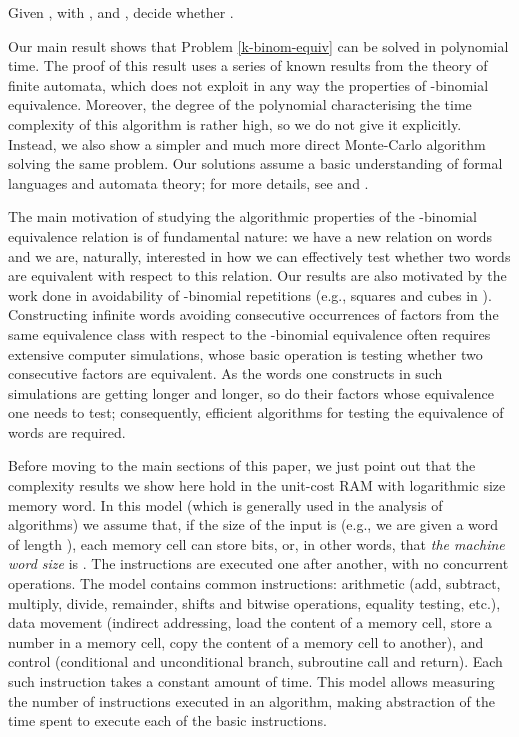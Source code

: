 \documentclass[runningheads]{llncs}
\begin{document}
\begin{problem}\label{k-binom-equiv}
Given , with , and , decide whether .
\end{problem}

Our main result shows that Problem \ref{k-binom-equiv} can be solved in polynomial time. The proof of this result uses a series of known results from the theory of finite automata, which does not exploit in any way the properties of -binomial equivalence. Moreover, the degree of the polynomial characterising the time complexity of this algorithm is rather high, so we do not give it explicitly. Instead, we also show a simpler and much more direct Monte-Carlo algorithm solving the same problem. Our solutions assume a basic understanding of formal languages and automata theory; for more details, see \cite{roz:han} and \cite{Sak09}.

The main motivation of studying the algorithmic properties of the -binomial equivalence relation is of fundamental nature: we have a new relation on words and we are, naturally, interested in how we can effectively test whether two words are equivalent with respect to this relation. Our results are also motivated by the work done in avoidability of -binomial repetitions (e.g., squares and cubes in \cite{rigo2}). Constructing infinite words avoiding consecutive occurrences of factors from the same equivalence class with respect to the -binomial equivalence often requires extensive computer simulations, whose basic operation is testing whether two consecutive factors are equivalent. As the words one constructs in such simulations are getting longer and longer, so do their factors whose equivalence one needs to test; consequently, efficient algorithms for testing the equivalence of words are required.

Before moving to the main sections of this paper, we just point out that the complexity results we show here hold in the unit-cost RAM with logarithmic size memory word. In this model (which is generally used in the analysis of algorithms) we assume that, if the size of the input is  (e.g., we are given a word of length ), each memory cell can store  bits, or, in other words, that {\em the machine word size} is . The instructions are executed one after another, with no concurrent operations. The model contains common instructions: arithmetic (add, subtract, multiply, divide, remainder, shifts and bitwise operations, equality testing, etc.), data movement (indirect addressing, load the content of a memory cell, store a number in a memory cell, copy the content of a memory cell to another), and control (conditional and unconditional branch, subroutine call and return). Each such instruction takes a constant amount of time.  This model allows measuring the number of instructions executed in an algorithm, making abstraction of the time spent to execute each of the basic instructions.
\end{document}

